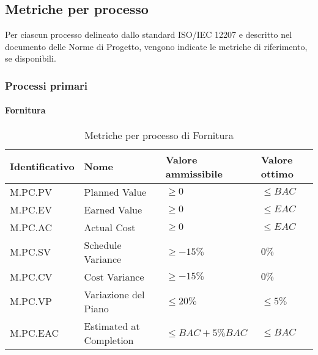 \subsection{Metriche per processo}
\label{subsec:processi_metriche}
Per ciascun processo delineato dallo standard ISO/IEC 12207 e descritto nel documento delle Norme di Progetto, 
vengono indicate le metriche di riferimento, se disponibili.

\subsubsection{Processi primari}
\paragraph{Fornitura}
\begin{table}[H]
    \centering
    \begin{tabular}{| l | l | l | l |}
    \hline
    \textbf{Identificativo} & 
    \textbf{Nome} &
    \textbf{Valore ammissibile} &
    \textbf{Valore ottimo}\\
    \hline
        M.PC.PV & Planned Value & $\geq 0$ & $\leq BAC$ \\
    \hline
        M.PC.EV & Earned Value & $\geq 0$ & $\leq EAC$ \\
    \hline
        M.PC.AC & Actual Cost & $\geq 0$ & $\leq EAC$ \\
    \hline
        M.PC.SV & Schedule Variance & $\geq -15\%$ & $0\%$ \\
    \hline
        M.PC.CV & Cost Variance & $\geq -15\%$ & $0\%$ \\
    \hline  
        M.PC.VP & Variazione del Piano & $\leq 20\%$ & $\leq 5\%$ \\
    \hline
        M.PC.EAC & Estimated at Completion & $\leq BAC+5\% BAC$ & $\leq BAC$ \\
    \hline
\end{tabular}
\caption{Metriche per processo di Fornitura}
\label{tab:metriche_fornitura} 
\end{table}

